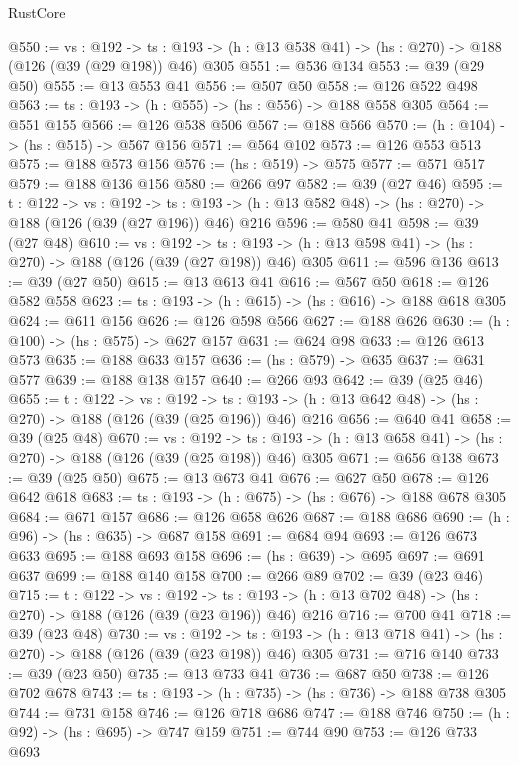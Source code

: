 \begin{lexlean}{RustCore}
\begin{coremodule}
@550 := {vs : @192} ->
  {ts : @193} -> (h : @13 @538 @41) -> (hs : @270) -> @188 (@126 (@39 (@29 @198)) @46) @305
@551 := @536 @134
@553 := @39 (@29 @50)
@555 := @13 @553 @41
@556 := @507 @50
@558 := @126 @522 @498
@563 := {ts : @193} -> (h : @555) -> (hs : @556) -> @188 @558 @305
@564 := @551 @155
@566 := @126 @538 @506
@567 := @188 @566
@570 := (h : @104) -> (hs : @515) -> @567 @156
@571 := @564 @102
@573 := @126 @553 @513
@575 := @188 @573 @156
@576 := (hs : @519) -> @575
@577 := @571 @517
@579 := @188 @136 @156
@580 := @266 @97
@582 := @39 (@27 @46)
@595 := {t : @122} ->
  {vs : @192} ->
  {ts : @193} -> (h : @13 @582 @48) -> (hs : @270) -> @188 (@126 (@39 (@27 @196)) @46) @216
@596 := @580 @41
@598 := @39 (@27 @48)
@610 := {vs : @192} ->
  {ts : @193} -> (h : @13 @598 @41) -> (hs : @270) -> @188 (@126 (@39 (@27 @198)) @46) @305
@611 := @596 @136
@613 := @39 (@27 @50)
@615 := @13 @613 @41
@616 := @567 @50
@618 := @126 @582 @558
@623 := {ts : @193} -> (h : @615) -> (hs : @616) -> @188 @618 @305
@624 := @611 @156
@626 := @126 @598 @566
@627 := @188 @626
@630 := (h : @100) -> (hs : @575) -> @627 @157
@631 := @624 @98
@633 := @126 @613 @573
@635 := @188 @633 @157
@636 := (hs : @579) -> @635
@637 := @631 @577
@639 := @188 @138 @157
@640 := @266 @93
@642 := @39 (@25 @46)
@655 := {t : @122} ->
  {vs : @192} ->
  {ts : @193} -> (h : @13 @642 @48) -> (hs : @270) -> @188 (@126 (@39 (@25 @196)) @46) @216
@656 := @640 @41
@658 := @39 (@25 @48)
@670 := {vs : @192} ->
  {ts : @193} -> (h : @13 @658 @41) -> (hs : @270) -> @188 (@126 (@39 (@25 @198)) @46) @305
@671 := @656 @138
@673 := @39 (@25 @50)
@675 := @13 @673 @41
@676 := @627 @50
@678 := @126 @642 @618
@683 := {ts : @193} -> (h : @675) -> (hs : @676) -> @188 @678 @305
@684 := @671 @157
@686 := @126 @658 @626
@687 := @188 @686
@690 := (h : @96) -> (hs : @635) -> @687 @158
@691 := @684 @94
@693 := @126 @673 @633
@695 := @188 @693 @158
@696 := (hs : @639) -> @695
@697 := @691 @637
@699 := @188 @140 @158
@700 := @266 @89
@702 := @39 (@23 @46)
@715 := {t : @122} ->
  {vs : @192} ->
  {ts : @193} -> (h : @13 @702 @48) -> (hs : @270) -> @188 (@126 (@39 (@23 @196)) @46) @216
@716 := @700 @41
@718 := @39 (@23 @48)
@730 := {vs : @192} ->
  {ts : @193} -> (h : @13 @718 @41) -> (hs : @270) -> @188 (@126 (@39 (@23 @198)) @46) @305
@731 := @716 @140
@733 := @39 (@23 @50)
@735 := @13 @733 @41
@736 := @687 @50
@738 := @126 @702 @678
@743 := {ts : @193} -> (h : @735) -> (hs : @736) -> @188 @738 @305
@744 := @731 @158
@746 := @126 @718 @686
@747 := @188 @746
@750 := (h : @92) -> (hs : @695) -> @747 @159
@751 := @744 @90
@753 := @126 @733 @693

\end{coremodule}
\end{lexlean}
